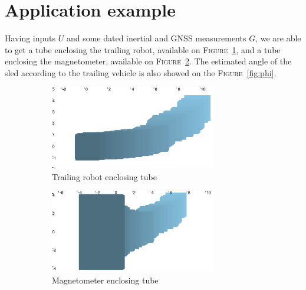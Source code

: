 \section*{Application example}
    Having inputs $U$ and some dated inertial and GNSS measurements $G$, we are able to get a tube enclosing the trailing robot, available on \textsc{Figure}~\ref{fig:trailing}, and a tube enclosing the magnetometer, available on \textsc{Figure}~\ref{fig:magneto}. The estimated angle of the sled according to the trailing vehicle is also showed on the \textsc{Figure}~\ref{fig:phi}.

    \begin{figure}[!htb]
        \begin{subfigure}{0.5\textwidth}
            \centering
            \includegraphics[width=0.8\textwidth]{imgs/example_saturne.png}
            \caption{Trailing robot enclosing tube}
            \label{fig:trailing}
            \hfill
        \end{subfigure}
        \newline
        \begin{subfigure}{0.5\textwidth}
            \centering
            \includegraphics[width=0.8\textwidth]{imgs/example_magnetometer.png}
            \caption{Magnetometer enclosing tube}
            \label{fig:magneto}
            \hfill
        \end{subfigure}
        \newline
        \begin{subfigure}{0.5\textwidth}

\end{subfigure}
\end{figure}
